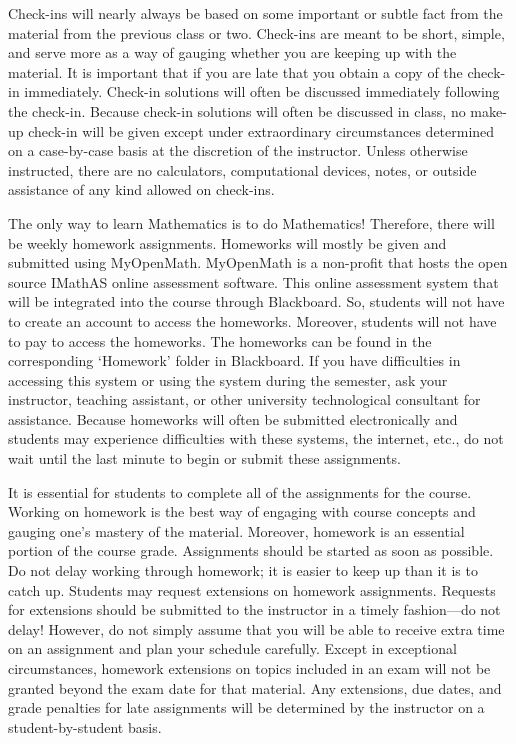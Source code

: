 \documentclass[11pt,letterpaper]{article}
\begin{document}
Check-ins will nearly always be based on some important or subtle fact from the material from the previous class or two. Check-ins are meant to be short, simple, and serve more as a way of gauging whether you are keeping up with the material. It is important that if you are late that you obtain a copy of the check-in immediately. Check-in solutions will often be discussed immediately following the check-in. Because check-in solutions will often be discussed in class, no make-up check-in will be given except under extraordinary circumstances determined on a case-by-case basis at the discretion of the instructor. Unless otherwise instructed, there are no calculators, computational devices, notes, or outside assistance of any kind allowed on check-ins. 
\sectionbreak




The only way to learn Mathematics is to do Mathematics! Therefore, there will be weekly homework assignments. Homeworks will mostly be given and submitted using MyOpenMath. MyOpenMath is a non-profit that hosts the open source IMathAS online assessment software. This online assessment system that will be integrated into the course through Blackboard. So, students will not have to create an account to access the homeworks. Moreover, students will not have to pay to access the homeworks. The homeworks can be found in the corresponding `Homework' folder in Blackboard. If you have difficulties in accessing this system or using the system during the semester, ask your instructor, teaching assistant, or other university technological consultant for assistance. Because homeworks will often be submitted electronically and students may experience difficulties with these systems, the internet, etc., do not wait until the last minute to begin or submit these assignments. \pspace

It is essential for students to complete all of the assignments for the course. Working on homework is the best way of engaging with course concepts and gauging one's mastery of the material. Moreover, homework is an essential portion of the course grade. Assignments should be started as soon as possible. Do not delay working through homework; it is easier to keep up than it is to catch up. Students may request extensions on homework assignments. Requests for extensions should be submitted to the instructor in a timely fashion---do not delay! However, do not simply assume that you will be able to receive extra time on an assignment and plan your schedule carefully. Except in exceptional circumstances, homework extensions on topics included in an exam will not be granted beyond the exam date for that material. Any extensions, due dates, and grade penalties for late assignments will be determined by the instructor on a student-by-student basis. \pspace
\end{document}
